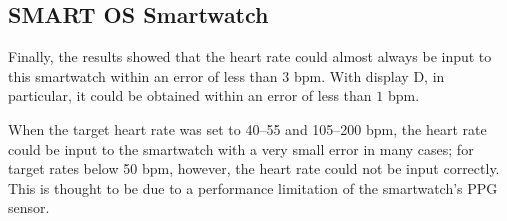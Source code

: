 \subsection{SMART OS Smartwatch}
Finally, the results showed that the heart rate could almost always be input to this smartwatch within an error of less than $3$ bpm. With display D, in particular, it could be obtained within an error of less than $1$ bpm.\par

When the target heart rate was set to 40--55 and 105--200 bpm, the heart rate could be input to the smartwatch with a very small error in many cases; for target rates below 50 bpm, however, the heart rate could not be input correctly. This is thought to be due to a performance limitation of the smartwatch's PPG sensor.
